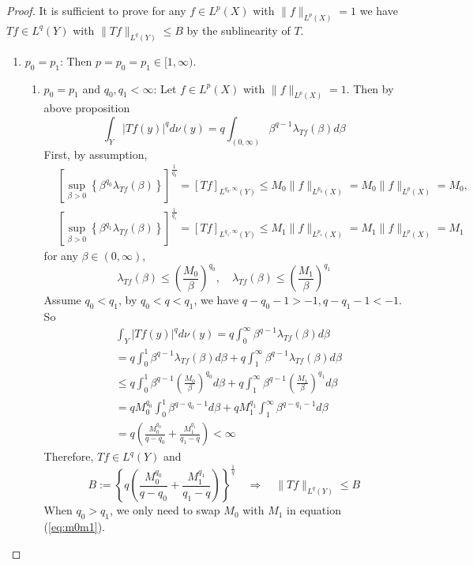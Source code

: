 \begin{proof}
	It is sufficient to prove for any $f \in L^p(X)$ with $\|f\|_{L^p(X)}=1$ we have $T f \in L^q(Y)$ with $\|T f\|_{L^q(Y)} \leq B$ by the sublinearity of $T$. 
	\begin{enumerate}[label=(\Roman*)]
		\item $p_0 = p_1$: Then $p = p_0 = p_1 \in [1,\infty)$.
		\begin{enumerate}[label=\theenumi-\arabic{*}]
			\item $p_0 = p_1$ and $q_0,q_1 < \infty$: Let $f \in L^p(X)$ with $\|f\|_{L^p(X)}=1$. Then by above proposition
			\begin{equation*}
				\int_Y|T f(y)|^q d \nu(y)=q \int_{(0, \infty)} \beta^{q-1} \lambda_{T f}(\beta) d \beta
			\end{equation*}
			First, by assumption,
			\begin{equation*}
				\begin{aligned}
					& {\left[\sup _{\beta>0}\left\{\beta^{q_0} \lambda_{T f}(\beta)\right\}\right]^{\frac{1}{q_0}}=[T f]_{L^{q_0, \infty}(Y)} \leq M_0\|f\|_{L^{p_0}(X)}=M_0\|f\|_{L^p(X)}=M_0,} \\
					& {\left[\sup _{\beta>0}\left\{\beta^{q_1} \lambda_{T f}(\beta)\right\}\right]^{\frac{1}{q_1}}=[T f]_{L^{q_1, \infty}(Y)} \leq M_1\|f\|_{L^{p_1}(X)}=M_1\|f\|_{L^p(X)}=M_1}
				\end{aligned}
			\end{equation*}
			for any $\beta \in (0,\infty)$,
			\begin{equation*}
				\lambda_{T f}(\beta) \leq\left(\frac{M_0}{\beta}\right)^{q_0}, \quad \lambda_{T f}(\beta) \leq\left(\frac{M_1}{\beta}\right)^{q_1}
			\end{equation*}
			Assume $q_0 < q_1$, by $q_0 < q < q_1$, we have $q-q_0-1>-1, q-q_1-1<-1$. So
			\begin{equation}\label{eq:m0m1}
				\begin{aligned}
					& \int_Y|T f(y)|^q d \nu(y)=q \int_0^{\infty} \beta^{q-1} \lambda_{T f}(\beta) d \beta \\
					& =q \int_0^1 \beta^{q-1} \lambda_{T f}(\beta) d \beta+q \int_1^{\infty} \beta^{q-1} \lambda_{T f}(\beta) d \beta \\
					& \leq q \int_0^1 \beta^{q-1}\left(\frac{M_0}{\beta}\right)^{q_0} d \beta+q \int_1^{\infty} \beta^{q-1}\left(\frac{M_1}{\beta}\right)^{q_1} d \beta \\
					& =q M_0^{q_0} \int_0^1 \beta^{q-q_0-1} d \beta+q M_1^{q_1} \int_1^{\infty} \beta^{q-q_1-1} d \beta \\
					& =q\left(\frac{M_0^{q_0}}{q-q_0}+\frac{M_1^{q_1}}{q_1-q}\right)<\infty
				\end{aligned}
			\end{equation}
			Therefore, $Tf \in L^q(Y)$ and 
			\begin{equation*}
				B:=\left\{q\left(\frac{M_0^{q_0}}{q-q_0}+\frac{M_1^{q_1}}{q_1-q}\right)\right\}^{\frac{1}{q}}\quad \Rightarrow \quad \|T f\|_{L^q(Y)} \leq B
			\end{equation*}
			When $q_0 > q_1$, we only need to swap $M_0$ with $M_1$ in equation (\ref{eq:m0m1}).


\end{enumerate}
\end{enumerate}
\end{proof}
